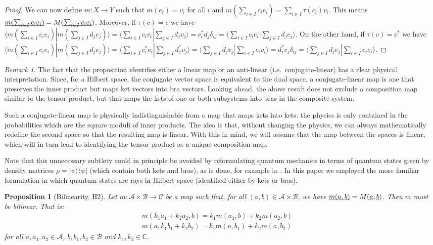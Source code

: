 \documentclass[aps,prl,amsmath,amssymb,twocolumn,nofootinbib]{revtex4}
\theoremstyle{plain}
\newtheorem{prop}[thrm]{Proposition}
\theoremstyle{definition}
\theoremstyle{remark}
\newtheorem*{remark}{Remark}
\newcommand{\pj}[1] {\underbar{$#1$}}
\def\>{\rangle}
\def\<{\langle}
\begin{document}
\begin{proof}
		We can now define $m : X \to Y$ such that $m(e_i) = v_i$ for all $i$ and $m(\sum_{i \in I} c_i e_i) = \sum_{i \in I} \tau(c_i) v_i$. This means $\underbar{$m(\sum_{i \in I} c_i e_i)$} = M(\underbar{$\sum_{i \in I} c_i e_i$})$. Moreover, if $\tau(c) = c$ we have $\<m(\sum_{i \in I} c_i e_i)|m(\sum_{j \in I} d_j e_j)\> = \<\sum_{i \in I} c_i v_i|\sum_{j \in I} d_j v_j\> = c_i^* d_j \delta_{ij} = \<\sum_{i \in I} c_i e_i|\sum_{j \in I} d_j e_j\>$. On the other hand, if $\tau(c) = c^*$ we have $\<m(\sum_{i \in I} c_i e_i)|m(\sum_{j \in I} d_j e_j)\> = \<\sum_{i \in I} c_i^* v_i|\sum_{j \in I} d_j^* v_j\> = \<\sum_{j \in I} d_j v_j|\sum_{i \in I} c_i v_i\> = d_i^* c_j \delta_{ij} = \<\sum_{j \in I} d_j e_j|\sum_{i \in I} c_i e_i\>$.
	\end{proof}
	
	\begin{remark}
		The fact that the proposition identifies either a linear map or an anti-linear (i.e.~conjugate-linear)  has a clear physical interpretation. Since, for a Hilbert space, the conjugate vector space is equivalent to the dual space, a conjugate-linear map is one that preserves the inner product but maps ket vectors into bra vectors. Looking ahead, the above result does not exclude a composition map similar to the tensor product, but that maps the kets of one or both subsystems into bras in the composite system.
		
		Such a conjugate-linear map is physically indistinguishable from a map that maps kets into kets: the physics is only contained in the probabilities which are the square moduli of inner products. The idea is that, without changing the physics, we can always mathematically redefine the second space so that the resulting map is linear. With this in mind, we will assume that the map between the spaces is linear, which will in turn lead to identifying the tensor product as a unique composition map.
		
		Note that this unnecessary subtlety could in principle be avoided by
		reformulating quantum mechanics in terms of quantum states given by
		density matrices $\rho=|\psi\>\<\psi|$ (which contain both  kets and
		bras), as is done, for example in \cite{ozawa,holevo}. In this paper
		we employed the more familiar formulation in which quantum states are
		rays in Hilbert space (identified either by kets or bras).
	\end{remark}
	
	\begin{prop}[Bilinearity, H2]\label{prop_bilinearity}
		Let $m : \mathcal{A} \times \mathcal{B} \to \mathcal{C}$ be a map such that, for all $(a,b) \in \mathcal{A} \times \mathcal{B}$, we have $\pj{m(a,b)} = M(\pj{a}, \pj{b})$. Then $m$ must be bilinear. That is:
		\begin{align}
		m(k_1a_1 + k_2a_2, b)=k_1m(a_1, b) + k_2m(a_2, b) \\
		m(a, k_1b_1 + k_2b_2)=k_1m(a, b_1) + k_2m(a, b_2)
		\end{align}
		for all $a, a_1, a_2 \in \mathcal{A}$, $b, b_1, b_2 \in \mathcal{B}$ and $k_1, k_2 \in \mathbb{C}$.
	\end{prop}
	
\end{document}
